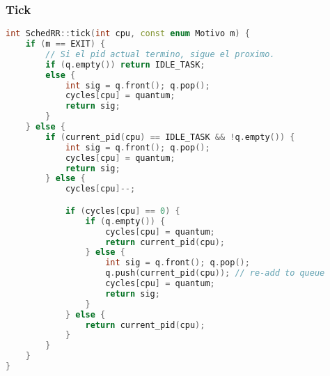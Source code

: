 \pagebreak

\subsubsection{Tick}
\begin{lstlisting}[language=C++, breaklines=true]
int SchedRR::tick(int cpu, const enum Motivo m) {
	if (m == EXIT) {
		// Si el pid actual termino, sigue el proximo.
		if (q.empty()) return IDLE_TASK;
		else {
			int sig = q.front(); q.pop();
			cycles[cpu] = quantum;
			return sig;
		}
	} else {
		if (current_pid(cpu) == IDLE_TASK && !q.empty()) {
			int sig = q.front(); q.pop();
			cycles[cpu] = quantum;
			return sig;
		} else {
			cycles[cpu]--;

			if (cycles[cpu] == 0) {
				if (q.empty()) {
					cycles[cpu] = quantum;
					return current_pid(cpu);
				} else {
					int sig = q.front(); q.pop();
					q.push(current_pid(cpu)); // re-add to queue
					cycles[cpu] = quantum;
					return sig;
				}
			} else {
				return current_pid(cpu);
			}
		}
	}
}
\end{lstlisting}




